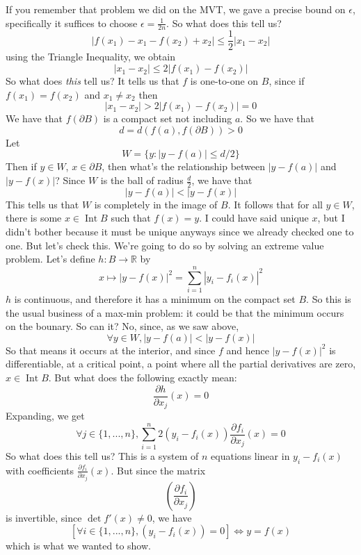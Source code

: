 \documentclass{article}
\DeclareMathOperator{\Int}{Int}
\newcommand{\reals}[0]{\mathbb{R}}
\newcommand{\prt}[2]{\frac{\partial #1}{\partial #2}}
\begin{document}
If you remember that problem we did on the MVT, we gave a precise bound on \(\epsilon\), specifically it suffices to choose \(\epsilon = \frac{1}{2n}\). So what does this tell us?
\[|f(x_1) - x_1 - f(x_2) + x_2| \leq \frac{1}{2}|x_1 - x_2|\]
using the Triangle Inequality, we obtain
\[|x_1 - x_2| \leq 2|f(x_1) - f(x_2)|\]
So what does \textit{this} tell us? It tells us that \(f\) is one-to-one on \(B\), since if \(f(x_1) = f(x_2)\) and \(x_1 \neq x_2\) then
\[|x_1 - x_2| > 2|f(x_1) - f(x_2)| = 0\]
We have that \(f(\partial B)\) is a compact set not including \(a\). So we have that
\[d = d(f(a), f(\partial B)) > 0\]
Let
\[W = \{y : |y - f(a)| \leq d/2\}\]
Then if \(y \in W\), \(x \in \partial B\), then what's the relationship between
\(|y - f(a)|\) and \(|y - f(x)|\)? Since \(W\) is the ball of radius \(\frac{d}{2}\), we have that
\[|y - f(a)| < |y - f(x)|\]
This tells us that \(W\) is completely in the image of \(B\). It follows that for all \(y \in W\), there is some \(x \in \Int B\) such that \(f(x) = y\). I could have said unique \(x\), but I didn't bother because it must be unique anyways since we already checked one to one. But let's check this. We're going to do so by solving an extreme value problem. Let's define \(h: B \to \reals\) by
\[x \mapsto |y - f(x)|^2 = \sum_{i = 1}^n|y_i - f_i(x)|^2\]
\(h\) is continuous, and therefore it has a minimum on the compact set \(B\). So this is the usual business of a max-min problem: it could be that the minimum occurs on the bounary. So can it? No, since, as we saw above,
\[\forall y \in W, |y - f(a)| < |y - f(x)|\]
So that means it occurs at the interior, and since \(f\) and hence \(|y - f(x)|^2\) is differentiable, at a critical point, a point where all the partial derivatives are zero, \(x \in \Int B\). But what does the following exactly mean:
\[\prt{h}{x_j}(x) = 0\]
Expanding, we get
\[\forall j \in \{1,...,n\}, \sum_{i = 1}^n2(y_i - f_i(x))\prt{f_i}{x_j}(x) = 0\]
So what does this tell us? This is a system of \(n\) equations linear in \(y_i - f_i(x)\) with coefficients \(\prt{f_i}{x_j}(x)\). But since the matrix
\[\left(\prt{f_i}{x_j}\right)\]
is invertible, since \(\det f'(x) \neq 0\), we have
\[[\forall i \in \{1,...,n\}, (y_i - f_i(x)) = 0] \iff y = f(x)\]
which is what we wanted to show.
\end{document}
